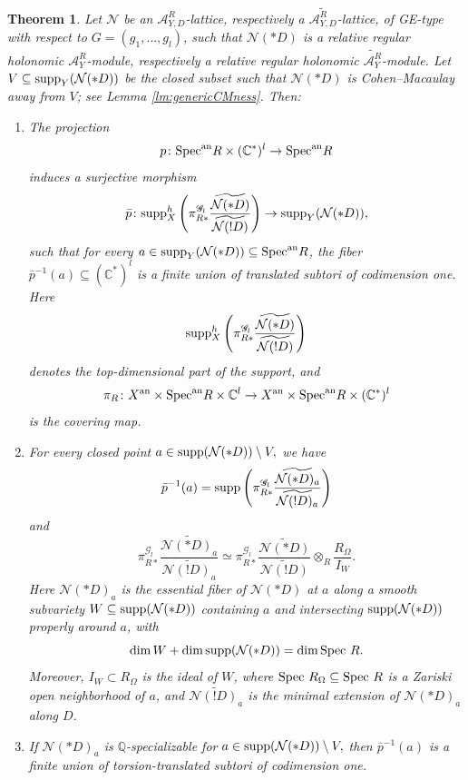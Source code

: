 \documentclass{amsart}
\theoremstyle{plain}
\newtheorem{theorem}{Theorem}
\numberwithin{theorem}{section}
\theoremstyle{definition}
\theoremstyle{remark}
\theoremstyle{definition}
\newcommand{\wt}{\widetilde}
\newcommand{\C}{\mathbb{C}} %
\newcommand{\Q}{\mathbb{Q}}
\newcommand{\cN}{\mathcal{N}}
\newcommand{\sA}{\mathscr{A}}
\newcommand{\sG}{\mathscr{G}}
\newcommand{\Spec}{\textup{Spec }}
\newcommand{\Specan}{\textup{Spec}^{\textup{an}}}
\newcommand{\an}{\textup{an}}
\newcommand{\supp}{\textup{supp}}
\begin{document}
\begin{theorem}\label{thm:equivmainsuppfiberation}
Let $\cN$ be an $\sA^R_{Y,D}$-lattice, respectively a
$\wt{\sA^R_{Y,D}}$-lattice, of GE-type with respect to
$G=(g_1,\dots,g_l)$,
such that $\cN(*D)$ is a relative regular holonomic $\sA^R_Y$-module,
respectively a relative regular holonomic $\wt{\sA^R_Y}$-module. Let
$V\subseteq \supp_Y(\cN(*D))$
be the closed subset such that $\cN(*D)$ is Cohen--Macaulay away from $V$;
see Lemma \ref{lm:genericCMness}. Then:
\begin{enumerate}[label=$(\arabic*)$]
    \item The projection
    \[
    p\colon \Specan R\times(\C^*)^l\to \Specan R
    \]
    induces a surjective morphism
    \[
    \bar p\colon
    \supp_X^h
    \left(
    \pi_{R*}^{\sG_l}
    \frac{\wt{\cN(*D)}}{\wt{\cN(!D)}}
    \right)
    \to
    \supp_Y(\cN(*D)),
    \]
    such that for every
    $a\in \supp_Y(\cN(*D))\subseteq \Specan R$,
    the fiber
    $\bar p^{-1}(a)\subseteq(\C^*)^l$
    is a finite union of translated subtori of codimension one. Here
    \[
    \supp_X^h
    \left(
    \pi_{R*}^{\sG_l}
    \frac{\wt{\cN(*D)}}{\wt{\cN(!D)}}
    \right)
    \]
    denotes the top-dimensional part of the support, and
    \[
    \pi_R\colon
    X^\an\times \Specan R\times \C^l
    \to
    X^\an\times \Specan R\times(\C^*)^l
    \]
    is the covering map.

    \item For every closed point
    $a\in \supp(\cN(*D))\setminus V,$
    we have
    \[
    \bar p^{-1}(a)
    =
    \supp
    \left(
    \pi_{R*}^{\sG_l}
    \frac{\wt{\cN(*D)_a}}{\wt{\cN(!D)_a}}
    \right)
    \]
    and
    \[
    \pi_{R*}^{\sG_l}
    \frac{\wt{\cN(*D)_a}}{\wt{\cN(!D)_a}}
    \simeq
    \pi_{R*}^{\sG_l}
    \frac{\wt{\cN(*D)}}{\wt{\cN(!D)}}
    \otimes_R
    \frac{R_\Omega}{I_W}.
    \]
    Here $\cN(*D)_a$ is the essential fiber of $\cN(*D)$ at $a$ along a
    smooth subvariety
   $W\subseteq \supp(\cN(*D))$
    containing $a$ and intersecting $\supp(\cN(*D))$ properly around $a$, with
    \[
    \dim W+\dim\supp(\cN(*D))=\dim\Spec R.
    \]
    Moreover, $I_W\subset R_\Omega$ is the ideal of $W$, where
    $\Spec R_\Omega\subseteq\Spec R$ is a Zariski open neighborhood of $a$,
    and $\wt{\cN(!D)_a}$ is the minimal extension of $\cN(*D)_a$ along $D$.

    \item If $\cN(*D)_a$ is $\Q$-specializable for
    $a\in \supp(\cN(*D))\setminus V,$
    then $\bar p^{-1}(a)$ is a finite union of torsion-translated subtori of
    codimension one.
\end{enumerate}
\end{theorem}
\end{document}
